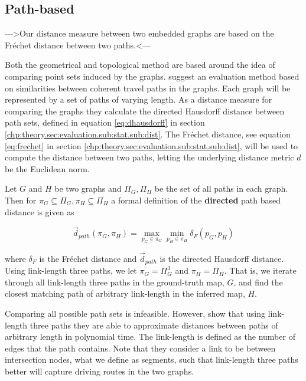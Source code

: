 \subsection{Path-based}
\label{chp:method.sec:evaluation.sub:pathbased}
--->Our distance measure between two embedded graphs are based on the Fréchet distance between two paths.<---



Both the geometrical and topological method are based around the idea of comparing point sets induced by the graphs. \cite{pathbased} suggest an evaluation method based on similarities between coherent travel paths in the graphs. Each graph will be represented by a set of paths of varying length. As a distance measure for comparing the graphs they calculate the directed Hausdorff distance between path sets, defined in equation \ref{eq:dhausdorff} in section \ref{chp:theory.sec:evaluation.sub:stat.sub:dist}. The Fréchet distance, see equation \ref{eq:frechet} in section \ref{chp:theory.sec:evaluation.sub:stat.sub:dist}, will be used to compute the distance between two paths, letting the underlying distance metric $d$ be the Euclidean norm. 

Let $G$ and $H$ be two graphs and $\Pi_G, \Pi_H$ be the set of all paths in each graph. Then for $\pi_G\subseteq\Pi_G, \pi_H\subseteq\Pi_H$ a formal definition of the \textbf{directed} path based distance is given as

\begin{equation}
    \overrightarrow{d}_{path} (\pi_G, \pi_H) = \max_{p_G\in \pi_G} \min_{p_H\in \pi_H} \delta_F(p_G, p_H)
\end{equation}

where $\delta_F$ is the Fréchet distance and $\overrightarrow{d}_{path}$ is the directed Hausdorff distance. Using link-length three paths, we let $\pi_G = \Pi_G^3$ and $\pi_H = \Pi_H$. That is, we iterate through all link-length three paths in the ground-truth map, $G$, and find the closest matching path of arbitrary link-length in the inferred map, $H$. %

Comparing all possible path sets is infeasible. However, \cite{pathbased} show that using link-length three paths they are able to approximate distances between paths of arbitrary length in polynomial time. The link-length is defined as the number of edges that the path contains. Note that they consider a link to be between intersection nodes, what we define as segments, such that link-length three paths better will capture driving routes in the two graphs.

